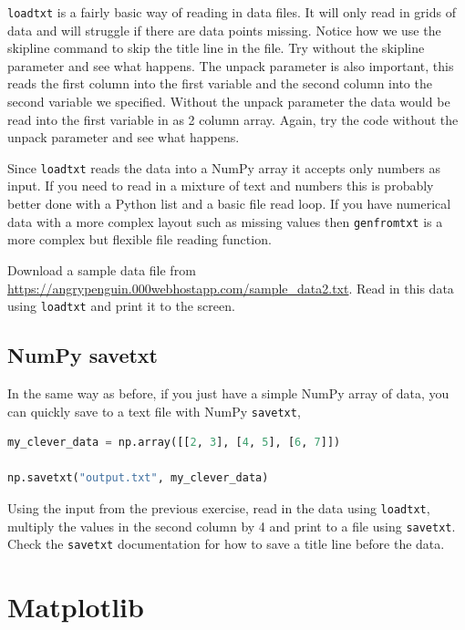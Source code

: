 \texttt{loadtxt} is a fairly basic way of reading in data files. It will only read in grids of data and will struggle if there are data points missing. Notice how we use the skipline command to skip the title line in the file. Try without the skipline parameter and see what happens. The unpack parameter is also important, this reads the first column into the first variable and the second column into the second variable we specified. Without the unpack parameter the data would be read into the first variable in as 2 column array. Again, try the code without the unpack parameter and see what happens.

Since \texttt{loadtxt} reads the data into a NumPy array it accepts only numbers as input. If you need to read in a mixture of text and numbers this is probably better done with a Python list and a basic file read loop. If you have numerical data with a more complex layout such as missing values then \texttt{genfromtxt} is a more complex but flexible file reading function.

\begin{task}Download a sample data file from \url{https://angrypenguin.000webhostapp.com/sample_data2.txt}. Read in this data using \texttt{loadtxt} and print it to the screen.\end{task}

	\subsection{NumPy savetxt}
		In the same way as before, if you just have a simple NumPy array of data, you can quickly save to a text file with NumPy \texttt{savetxt},
		\begin{lstlisting}[language=Python]
my_clever_data = np.array([[2, 3], [4, 5], [6, 7]])

np.savetxt("output.txt", my_clever_data)\end{lstlisting}

\begin{task}Using the input from the previous exercise, read in the data using \texttt{loadtxt}, multiply the values in the second column by 4 and print to a file using \texttt{savetxt}. Check the \texttt{savetxt} documentation for how to save a title line before the data.\end{task}

\section{Matplotlib}
